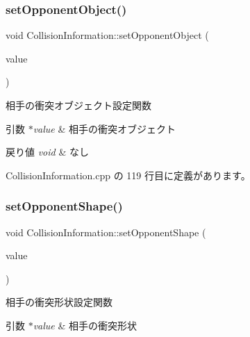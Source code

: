 \subsubsection{\texorpdfstring{set\+Opponent\+Object()}{setOpponentObject()}}
{\footnotesize\ttfamily void Collision\+Information\+::set\+Opponent\+Object (\begin{DoxyParamCaption}\item[{\mbox{\hyperlink{class_collision_object}{Collision\+Object}} $\ast$}]{value }\end{DoxyParamCaption})}



相手の衝突オブジェクト設定関数 


\begin{DoxyParams}{引数}
{\em $\ast$value} & 相手の衝突オブジェクト \\
\hline
\end{DoxyParams}

\begin{DoxyRetVals}{戻り値}
{\em void} & なし \\
\hline
\end{DoxyRetVals}


 Collision\+Information.\+cpp の 119 行目に定義があります。

\mbox{\label{class_collision_information_a488caeec48c2327d3bb01c7884af688a}} 
\subsubsection{\texorpdfstring{set\+Opponent\+Shape()}{setOpponentShape()}}
{\footnotesize\ttfamily void Collision\+Information\+::set\+Opponent\+Shape (\begin{DoxyParamCaption}\item[{\mbox{\hyperlink{class_collision_object_1_1_shape}{Collision\+Object\+::\+Shape}} $\ast$}]{value }\end{DoxyParamCaption})}



相手の衝突形状設定関数 


\begin{DoxyParams}{引数}
{\em $\ast$value} & 相手の衝突形状 \\
\hline
\end{DoxyParams}

